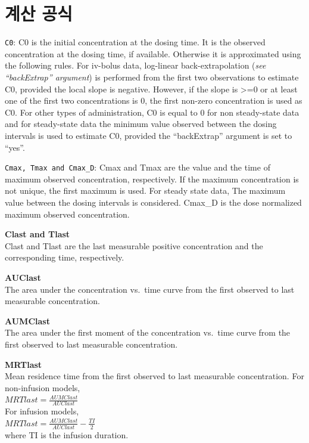 \documentclass[
  10pt,
]{krantz}
\begin{document}
\hypertarget{uxacc4uxc0b0-uxacf5uxc2dd}{%
\section{계산 공식}\label{uxacc4uxc0b0-uxacf5uxc2dd}}

\texttt{C0}: C0 is the initial concentration at the dosing time. It is the observed concentration at the dosing time, if available. Otherwise it is approximated using the following rules. For iv-bolus data, log-linear back-extrapolation (\emph{see ``backExtrap'' argument}) is performed from the first two observations to estimate C0, provided the local slope is negative. However, if the slope is \textgreater=0 or at least one of the first two concentrations is 0, the first non-zero concentration is used as C0. For other types of administration, C0 is equal to 0 for non steady-state data and for steady-state data the minimum value observed between the dosing intervals is used to estimate C0, provided the ``backExtrap'' argument is set to ``yes''.

\texttt{Cmax,\ Tmax\ and\ Cmax\_D}: Cmax and Tmax are the value and the time of maximum observed concentration, respectively. If the maximum concentration is not unique, the first maximum is used. For steady state data, The maximum value between the dosing intervals is considered. Cmax\_D is the dose normalized maximum observed concentration.

\textbf{Clast and Tlast}\\
Clast and Tlast are the last measurable positive concentration and the corresponding time, respectively.

\textbf{AUClast}\\
The area under the concentration vs.~time curve from the first observed to last measurable concentration.

\textbf{AUMClast}\\
The area under the first moment of the concentration vs.~time curve from the first observed to last measurable concentration.

\textbf{MRTlast}\\
Mean residence time from the first observed to last measurable concentration. For non-infusion models,\\
\(MRTlast = \frac{AUMClast}{AUClast}\)\\
For infusion models,\\
\(MRTlast = \frac{AUMClast}{AUClast}-\frac{TI}{2}\)\\
where TI is the infusion duration.
\end{document}
